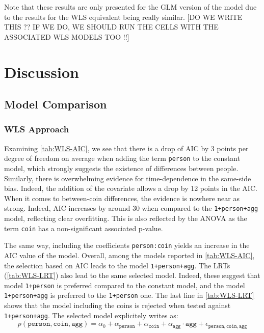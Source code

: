 \documentclass[a4paper, 12pt,oneside]{article}
\begin{document}
			Note that these results are only presented for the GLM version of the model due to the results for the WLS equivalent being really similar. 
			[DO WE WRITE THIS ?? IF WE DO, WE SHOULD RUN THE CELLS WITH THE ASSOCIATED WLS MODELS TOO !!]
	\section{Discussion}
		\subsection{Model Comparison}
		\subsubsection{WLS Approach}
		Examining \ref{tab:WLS-AIC}, we see that there is a drop of AIC by 3 points per degree of freedom on average when adding the term \texttt{person} to the constant model, which strongly suggests the existence of differences between people. Similarly, there is overwhelming evidence for time-dependence in the same-side bias. Indeed, the addition of the  covariate allows a drop by 12 points in the AIC. When it comes to between-coin differences, the evidence is nowhere near as strong. Indeed, AIC increases by around 30 when compared to the \texttt{1+person+agg} model, reflecting clear overfitting. This is also reflected by the ANOVA as the term \texttt{coin} has a non-significant associated p-value.

		The same way, including the coefficients \texttt{person:coin} yields an increase in the AIC value of the model. 
		Overall, among the models reported in \ref{tab:WLS-AIC}, the selection based on AIC leads to the model \texttt{1+person+agg}. 
		The LRTs (\ref{tab:WLS-LRT}) also lead to the same selected model. Indeed, these suggest that model \texttt{1+person} is preferred compared to the constant model, and the model \texttt{1+person+agg} is preferred to the \texttt{1+person} one. The last line in \ref{tab:WLS-LRT} shows that the model including the coins is rejected when tested against \texttt{1+person+agg}. The selected model explicitely writes as:  
		\begin{equation}
			\label{eq:wls_model}
			p(\texttt{person},\texttt{coin},\texttt{agg}) = \alpha_0 + \alpha_{\texttt{person}}+\alpha_{\texttt{coin}} +\alpha_{\texttt{agg}}\cdot\texttt{agg} + \epsilon_{\texttt{person},\texttt{coin},\texttt{agg}}
		\end{equation}   
\end{document}
